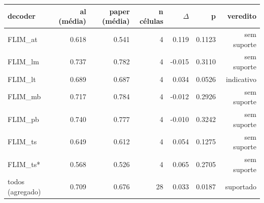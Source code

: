 \begin{tabular}{lrrrrrr}
\hline
decoder & al (média) & paper (média) & n células & $\Delta$ & p & veredito \\
\hline
FLIM\_at & 0.618 & 0.541 & 4 & 0.119 & 0.1123 & sem suporte \\
FLIM\_lm & 0.737 & 0.782 & 4 & -0.015 & 0.3110 & sem suporte \\
FLIM\_lt & 0.689 & 0.687 & 4 & 0.034 & 0.0526 & indicativo \\
FLIM\_mb & 0.717 & 0.784 & 4 & -0.012 & 0.2926 & sem suporte \\
FLIM\_pb & 0.740 & 0.777 & 4 & -0.010 & 0.3242 & sem suporte \\
FLIM\_ts & 0.649 & 0.612 & 4 & 0.054 & 0.1275 & sem suporte \\
FLIM\_ts* & 0.568 & 0.526 & 4 & 0.065 & 0.2705 & sem suporte \\
todos (agregado) & 0.709 & 0.676 & 28 & 0.033 & 0.0187 & suportado \\
\hline
\end{tabular}

